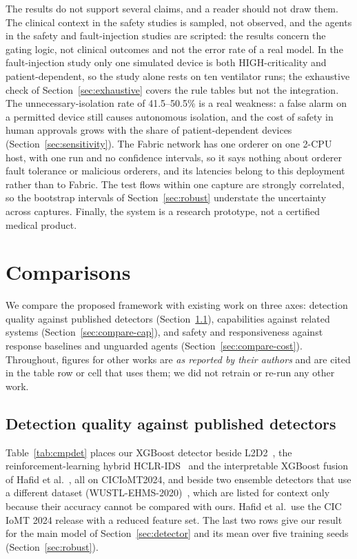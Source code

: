 \documentclass[preprint,12pt]{elsarticle}
\begin{document}
The results do not support several claims, and a reader should not draw them. The clinical context in the safety studies is sampled, not observed, and the agents in the safety and fault-injection studies are scripted: the results concern the gating logic, not clinical outcomes and not the error rate of a real model. In the fault-injection study only one simulated device is both HIGH-criticality and patient-dependent, so the study alone rests on ten ventilator runs; the exhaustive check of Section~\ref{sec:exhaustive} covers the rule tables but not the integration. The unnecessary-isolation rate of 41.5--50.5\% is a real weakness: a false alarm on a permitted device still causes autonomous isolation, and the cost of safety in human approvals grows with the share of patient-dependent devices (Section~\ref{sec:sensitivity}). The Fabric network has one orderer on one 2-CPU host, with one run and no confidence intervals, so it says nothing about orderer fault tolerance or malicious orderers, and its latencies belong to this deployment rather than to Fabric. The test flows within one capture are strongly correlated, so the bootstrap intervals of Section~\ref{sec:robust} understate the uncertainty across captures. Finally, the system is a research prototype, not a certified medical product.

\section{Comparisons}
\label{sec:comparison}

We compare the proposed framework with existing work on three axes: detection quality against published detectors (Section~\ref{sec:compare-det}), capabilities against related systems (Section~\ref{sec:compare-cap}), and safety and responsiveness against response baselines and unguarded agents (Section~\ref{sec:compare-cost}). Throughout, figures for other works are \emph{as reported by their authors} and are cited in the table row or cell that uses them; we did not retrain or re-run any other work.

\subsection{Detection quality against published detectors}
\label{sec:compare-det}
Table~\ref{tab:cmpdet} places our XGBoost detector beside L2D2~\cite{akar2025}, the reinforcement-learning hybrid HCLR-IDS~\cite{shaikh2025} and the interpretable XGBoost fusion of Hafid et al.~\cite{hafid2025}, all on CICIoMT2024, and beside two ensemble detectors that use a different dataset (WUSTL-EHMS-2020)~\cite{alsolami2024,abdelhaq2026}, which are listed for context only because their accuracy cannot be compared with ours. Hafid et al.\ use the CIC IoMT 2024 release with a reduced feature set. The last two rows give our result for the main model of Section~\ref{sec:detector} and its mean over five training seeds (Section~\ref{sec:robust}).
\end{document}
